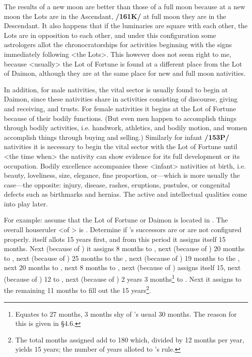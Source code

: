 The results of a new moon are better than those of a full
moon because at a new moon the Lots are in the Ascendant, \textbf{/161K/} at full moon they are in the Descendant. It also happens that if the luminaries are square with each other, the Lots are in opposition to each other, and under this configuration some astrologers allot the chronocratorships for activities beginning with the signs immediately following <the Lots>. This however does not seem right to me, because
<usually> the Lot of Fortune is found at a different place from the Lot of Daimon, although they are at the same place for new and full moon nativities.

In addition, for male nativities, the vital sector is usually found to begin at Daimon, since these nativities share in activities consisting of discourse, giving and receiving, and trusts. For female nativities it begins at the Lot of Fortune because of their bodily functions. (But even men happen to accomplish things through bodily activities, i.e. handwork, athletics, and bodily motion, and women accomplish
things through buying and selling.) Similarly for infant \textbf{/153P/} nativities it is necessary to begin the vital
sector with the Lot of Fortune until <the time when> the nativity can show evidence for its full development or its occupation. Bodily excellence accompanies these <infant> nativities at birth, i.e. beauty, loveliness, size, elegance, fine proportion, or—which is more usually the case—the opposite: injury, disease, rashes, eruptions, pustules, or congenital defects such as birthmarks and hernias. The
active and intellectual qualities come into play later.

For example: assume that the Lot of Fortune or Daimon is located in \Aries. The overall houseruler <of \Aries> is \Mars. Determine if \Mars’s successors are or are not configured properly. \Mars\xspace itself allots 15 years first, and from this period it assigns itself 15 months. Next (because of \Taurus) it assigns 8 months to \Venus, next (because of \Gemini) 20 months to \Mercury, next (because of \Cancer) 25 months to the \Moon, next (because of \Leo) 19 months to the \Sun, next 20 months to \Mercury, next 8 months to \Venus,
next (because of \Scorpio) \Mars assigns itself 15, next (because of \Sagittarius) 12 to \Jupiter, next (because of
\Capricorn) 2 years 3 months\footnote{Equates to 27 months, 3 months shy of \Saturn's usual 30 months. The reason for this is given in \S{4.6}.} to \Saturn. Next it assigns to \Aquarius\, the remaining 11 months to fill out the 15 years\footnote{The total months assigned add to 180 which, divided by 12 months per year, yields 15 years; the number of years alloted to \Mars's rule.}. 

